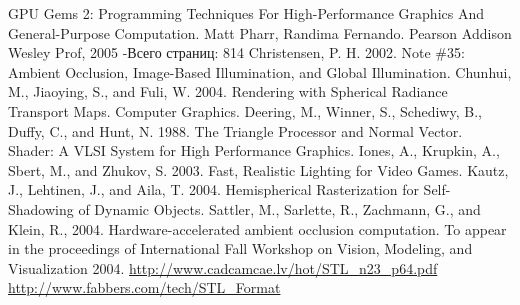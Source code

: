 






\setcounter{page}{2} 





\clearpage
\begin{thebibliography}{00}
 GPU Gems 2: Programming Techniques For High-Performance Graphics And General-Purpose Computation. Matt Pharr, Randima Fernando. Pearson Addison Wesley Prof, 2005  -Всего страниц: 814
 Christensen, P. H. 2002. Note \#35: Ambient Occlusion, Image-Based Illumination, and Global Illumination.
 Chunhui, M., Jiaoying, S., and Fuli, W. 2004. Rendering with Spherical Radiance Transport Maps. Computer Graphics.
 Deering, M., Winner, S., Schediwy, B., Duffy, C., and Hunt, N. 1988. The Triangle Processor and Normal Vector. Shader: A VLSI System for High Performance Graphics.
 Iones, A., Krupkin, A., Sbert, M., and Zhukov, S. 2003. Fast, Realistic Lighting for Video Games.
 Kautz, J., Lehtinen, J., and Aila, T.  2004.  Hemispherical Rasterization for Self-Shadowing of Dynamic Objects.
 Sattler, M., Sarlette, R., Zachmann, G., and Klein, R., 2004. Hardware-accelerated ambient occlusion computation. To appear in the proceedings of International Fall Workshop on Vision, Modeling, and Visualization 2004.
 \url{http://www.cadcamcae.lv/hot/STL_n23_p64.pdf}
 \url{http://www.fabbers.com/tech/STL_Format}
\end{thebibliography}




